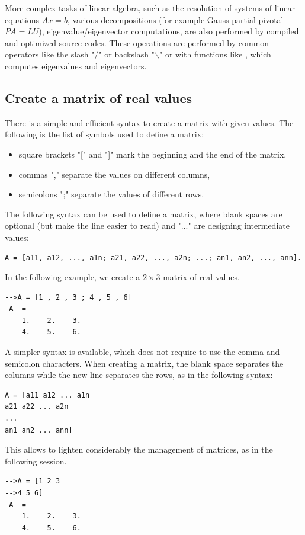 More complex tasks of linear algebra, such as the resolution of systems of 
linear equations $Ax=b$, various decompositions (for example Gauss 
partial pivotal $PA=LU$), eigenvalue/eigenvector computations, are also
performed by compiled and optimized source codes. These operations 
are performed by common operators like the slash "/" or backslash "$\backslash$" 
or with functions like ,
which computes eigenvalues and eigenvectors.

\subsection{Create a matrix of real values}

There is a simple and efficient syntax to create a matrix with given values.
The following is the list of symbols used to define a matrix:
\begin{itemize}
\item square brackets "[" and "]" mark the beginning and the end of the matrix, 
\item commas "," separate the values on different columns,
\item semicolons ";" separate the values of different rows. 
\end{itemize}
The following syntax can be used to define a matrix, where 
blank spaces are optional (but make the line easier to read) and 
"..." are designing intermediate values:
\lstset{language=scilabscript}
\begin{lstlisting}
A = [a11, a12, ..., a1n; a21, a22, ..., a2n; ...; an1, an2, ..., ann].
\end{lstlisting}
In the following example, we create a $2\times 3$ matrix of real values.
\lstset{language=scilabscript}
\begin{lstlisting}
-->A = [1 , 2 , 3 ; 4 , 5 , 6]
 A  =
    1.    2.    3.  
    4.    5.    6.  
\end{lstlisting}
A simpler syntax is available, which does not require to use the comma
and semicolon characters.
When creating a matrix, the blank space separates the 
columns while the new line separates the 
rows, as in the following syntax:
\lstset{language=scilabscript}
\begin{lstlisting}
A = [a11 a12 ... a1n
a21 a22 ... a2n
...
an1 an2 ... ann]
\end{lstlisting}
This allows to lighten considerably the management of matrices,
as in the following session.
\lstset{language=scilabscript}
\begin{lstlisting}
-->A = [1 2 3
-->4 5 6]
 A  =
    1.    2.    3.  
    4.    5.    6.  
\end{lstlisting}

